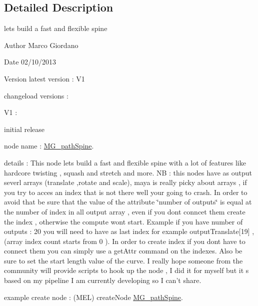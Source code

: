 \subsection{Detailed Description}
lets build a fast and flexible spine 

\begin{DoxyAuthor}{Author}
Marco Giordano 
\end{DoxyAuthor}
\begin{DoxyDate}{Date}
02/10/2013 
\end{DoxyDate}
\begin{DoxyVersion}{Version}
latest version \-: V1 

changeload versions \-: \par
 V1 \-: \par

\begin{DoxyItemize}
\item initial release \par

\end{DoxyItemize}
\end{DoxyVersion}
node name \-: \hyperlink{class_m_g__path_spine}{M\-G\-\_\-path\-Spine}.

details \-: This node lets build a fast and flexible spine with a lot of features like hardcore twisting , squash and stretch and more. N\-B \-: this nodes have as output severl arrays (translate ,rotate and scale), maya is really picky about arrays , if you try to acces an index that is not there well your going to crash. In order to avoid that be sure that the value of the attribute \char`\"{}number of outputs\char`\"{} is equal at the number of index in all output array , even if you dont conncet them create the index , otherwise the compute wont start. Example if you have number of outputs \-: 20 you will need to have as last index for example output\-Translate\mbox{[}19\mbox{]} , (array index count starts from 0 ). In order to create index if you dont have to connect them you can simply use a get\-Attr command on the indexes. Also be sure to set the start length value of the curve. I really hope someone from the community will provide scripts to hook up the node , I did it for myself but it s based on my pipeline I am currently developing so I can't share.

example create node \-: (M\-E\-L) create\-Node \hyperlink{class_m_g__path_spine}{M\-G\-\_\-path\-Spine}. 

